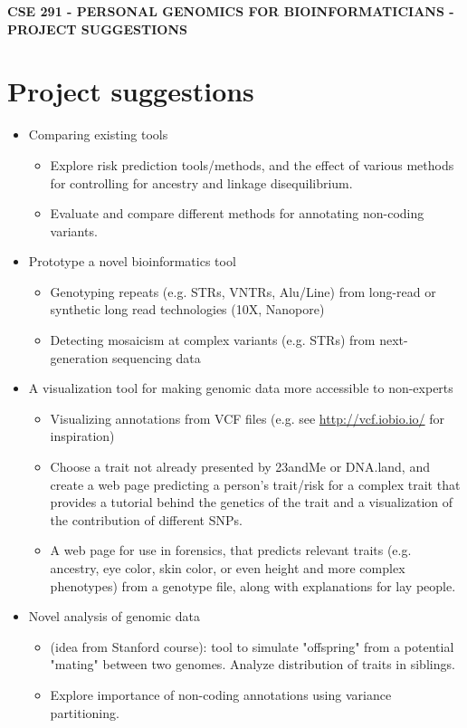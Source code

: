 \documentclass[12pt]{article}
\begin{document}
\textbf{CSE 291 - PERSONAL GENOMICS FOR BIOINFORMATICIANS - PROJECT SUGGESTIONS}

\section*{Project suggestions}

\begin{itemize}
	\item Comparing existing tools
	\begin{itemize}
		\item Explore risk prediction tools/methods, and the effect of various methods for controlling for ancestry and linkage disequilibrium.
		\item Evaluate and compare different methods for annotating non-coding variants. 
	\end{itemize}
	\item Prototype a novel bioinformatics tool
	\begin{itemize}
		\item Genotyping repeats (e.g. STRs, VNTRs, Alu/Line) from long-read or synthetic long read technologies (10X, Nanopore)
		\item Detecting mosaicism at complex variants (e.g. STRs) from next-generation sequencing data
	\end{itemize}
	\item A visualization tool for making genomic data more accessible to non-experts
	\begin{itemize}
		\item Visualizing annotations from VCF files (e.g. see \href{http://vcf.iobio.io/}{http://vcf.iobio.io/} for inspiration)
		\item Choose a trait not already presented by 23andMe or DNA.land, and create a web page predicting a person's trait/risk for a complex trait that provides a tutorial behind the genetics of the trait and a visualization of the contribution of different SNPs.
		\item A web page for use in forensics, that predicts relevant traits (e.g. ancestry, eye color, skin color, or even height and more complex phenotypes) from a genotype file, along with explanations for lay people.
	\end{itemize}
	\item Novel analysis of genomic data
	\begin{itemize}
		\item (idea from Stanford course): tool to simulate "offspring" from a potential "mating" between two genomes. Analyze distribution of traits in siblings.
		\item Explore importance of non-coding annotations using variance partitioning.
	\end{itemize}
\end{itemize}
\end{document}
